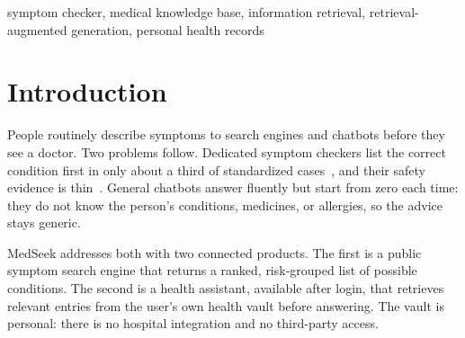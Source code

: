 \documentclass[conference]{IEEEtran}
\begin{document}
\begin{abstract}
General-purpose chatbots are widely used for symptom questions, but they know nothing about the person asking. MedSeek is a deployed web system that combines a public symptom search engine with a login-protected health assistant whose answers are grounded in the user's own encrypted health records. The search engine runs on MedSeek KB v1, a knowledge base of 1,222 conditions, 1,962 symptoms, and 11,554 condition--symptom links, rebuilt by a cached, repeatable pipeline in which a language model structures public reference text. Conditions are ranked by frequency- and rarity-weighted symptom evidence, the share of the query a condition explains, and a prevalence prior. On a 40-case sanity check written by the developers, the deployed formula places an expected condition first in 29 cases (73\%) and in the top three in 39 (98\%). An ablation shows that the prevalence prior costs four first-place hits but reduces urgent conditions among the top five results for single vague symptoms from 17 of 30 to 3 of 30. These figures are engineering measurements on cases the knowledge base was tuned against. They are not a clinical evaluation, and a season- and location-aware prior, the project's original goal, is not yet implemented.
\end{abstract}

\begin{IEEEkeywords}
symptom checker, medical knowledge base, information retrieval, retrieval-augmented generation, personal health records
\end{IEEEkeywords}

\section{Introduction}

People routinely describe symptoms to search engines and chatbots before they see a doctor. Two problems follow. Dedicated symptom checkers list the correct condition first in only about a third of standardized cases~\cite{semigran2015}, and their safety evidence is thin~\cite{fraser2018}. General chatbots answer fluently but start from zero each time: they do not know the person's conditions, medicines, or allergies, so the advice stays generic.

MedSeek addresses both with two connected products. The first is a public symptom search engine that returns a ranked, risk-grouped list of possible conditions. The second is a health assistant, available after login, that retrieves relevant entries from the user's own health vault before answering. The vault is personal: there is no hospital integration and no third-party access.
\end{document}
